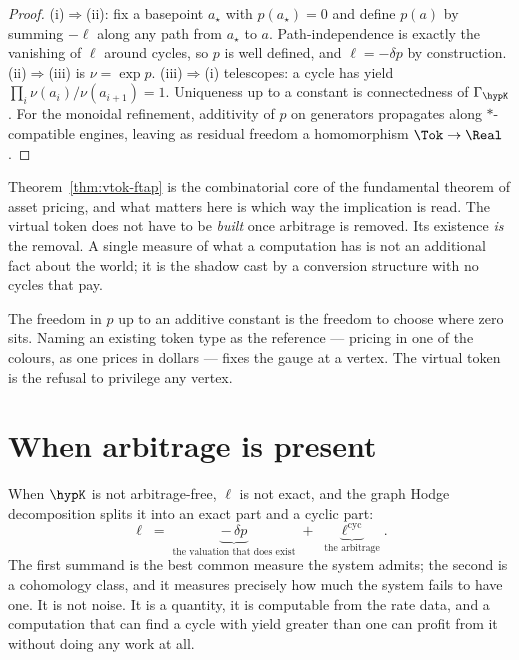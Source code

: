 \begin{proof}
(i)$\Rightarrow$(ii): fix a basepoint $a_\star$ with $p(a_\star) = 0$ and
define $p(a)$ by summing $-\ell$ along any path from $a_\star$ to $a$.
Path-independence is exactly the vanishing of $\ell$ around cycles, so
$p$ is well defined, and $\ell = -\delta p$ by construction.
(ii)$\Rightarrow$(iii) is $\nu = \exp p$.
(iii)$\Rightarrow$(i) telescopes: a cycle has yield
$\prod_i \nu(a_i)/\nu(a_{i+1}) = 1$.
Uniqueness up to a constant is connectedness of $\Gamma_{\hypK}$.
For the monoidal refinement, additivity of $p$ on generators propagates
along $\ast$-compatible engines, leaving as residual freedom a
homomorphism $\Tok \to \Real$.
\end{proof}

\begin{remark}
\label{rmk:vtok-direction}
Theorem~\ref{thm:vtok-ftap} is the combinatorial core of the fundamental
theorem of asset pricing, and what matters here is which way the
implication is read.
The virtual token does not have to be \emph{built} once arbitrage is
removed.
Its existence \emph{is} the removal.
A single measure of what a computation has is not an additional fact
about the world; it is the shadow cast by a conversion structure with no
cycles that pay.
\end{remark}

\begin{remark}[Gauge]
\label{rmk:vtok-gauge}
The freedom in $p$ up to an additive constant is the freedom to choose
where zero sits.
Naming an existing token type as the reference --- pricing in one of the
colours, as one prices in dollars --- fixes the gauge at a vertex.
The virtual token is the refusal to privilege any vertex.
\end{remark}

\section{When arbitrage is present}

When $\hypK$ is not arbitrage-free, $\ell$ is not exact, and the graph
Hodge decomposition splits it into an exact part and a cyclic part:
\[
  \ell \;=\; \underbrace{-\,\delta p}_{\text{the valuation that does exist}}
       \;+\; \underbrace{\ell^{\mathrm{cyc}}}_{\text{the arbitrage}} .
\]
The first summand is the best common measure the system admits; the
second is a cohomology class, and it measures precisely how much the
system fails to have one.
It is not noise.
It is a quantity, it is computable from the rate data, and a computation
that can find a cycle with yield greater than one can profit from it
without doing any work at all.

